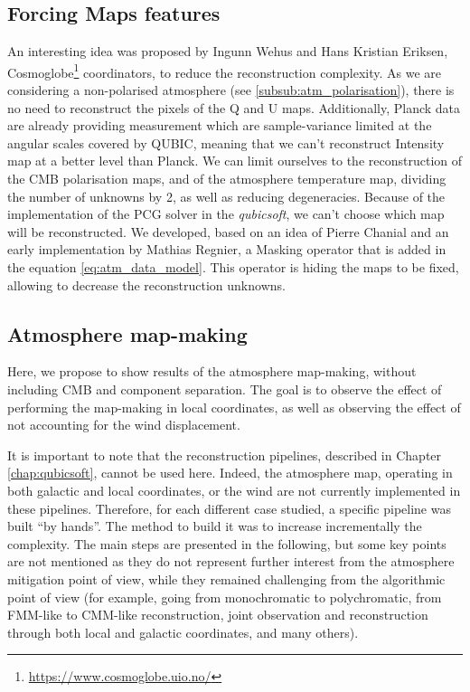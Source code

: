 \documentclass[../../thesis.tex]{subfiles}
\begin{document}
\subsection{Forcing Maps features} \label{sub:atm_maps_fixing}

An interesting idea was proposed by Ingunn Wehus and Hans Kristian Eriksen, Cosmoglobe\footnote{\url{https://www.cosmoglobe.uio.no/}} coordinators, to reduce the reconstruction complexity. As we are considering a non-polarised atmosphere (see \ref{subsub:atm_polarisation}), there is no need to reconstruct the pixels of the Q and U maps. Additionally, Planck data are already providing measurement which are sample-variance limited at the angular scales covered by QUBIC, meaning that we can't reconstruct Intensity map at a better level than Planck. We can limit ourselves to the reconstruction of the CMB polarisation maps, and of the atmosphere temperature map, dividing the number of unknowns by 2, as well as reducing degeneracies. 
Because of the implementation of the PCG solver in the \emph{qubicsoft}, we can't choose which map will be reconstructed. We developed, based on an idea of Pierre Chanial and an early implementation by Mathias Regnier, a Masking operator that is added in the equation \ref{eq:atm_data_model}. This operator is hiding the maps to be fixed, allowing to decrease the reconstruction unknowns. 

\subsection{Atmosphere map-making}

Here, we propose to show results of the atmosphere map-making, without including CMB and component separation. The goal is to observe the effect of performing the map-making in local coordinates, as well as observing the effect of not accounting for the wind displacement. 

It is important to note that the reconstruction pipelines, described in Chapter \ref{chap:qubicsoft}, cannot be used here. Indeed, the atmosphere map, operating in both galactic and local coordinates, or the wind are not currently implemented in these pipelines. Therefore, for each different case studied, a specific pipeline was built \enquote{by hands}. The method to build it was to increase incrementally the complexity. The main steps are presented in the following, but some key points are not mentioned as they do not represent further interest from the atmosphere mitigation point of view, while they remained challenging from the algorithmic point of view (for example, going from monochromatic to polychromatic, from FMM-like to CMM-like reconstruction, joint observation and reconstruction through both local and galactic coordinates, and many others).
\end{document}
